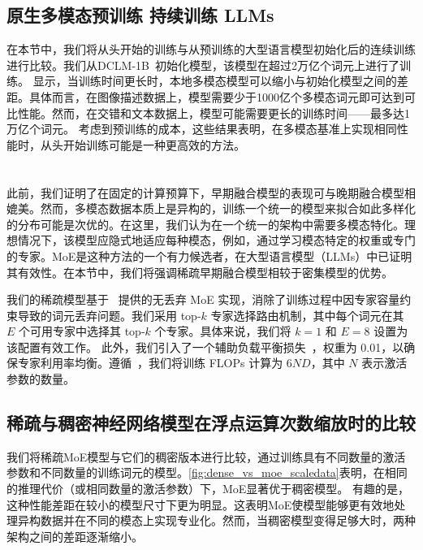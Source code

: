 \subsection{原生多模态预训练 \textbf{\vs} 持续训练 LLMs}
\label{sec:native_vs_continual}
在本节中，我们将从头开始的训练与从预训练的大型语言模型初始化后的连续训练进行比较。我们从DCLM-1B~\citep{fang2023data}初始化模型，该模型在超过2万亿个词元上进行了训练。
 显示，当训练时间更长时，本地多模态模型可以缩小与初始化模型之间的差距。具体而言，在图像描述数据上，模型需要少于1000亿个多模态词元即可达到可比性能。然而，在交错和文本数据上，模型可能需要更长的训练时间——最多达1万亿个词元。
考虑到预训练的成本，这些结果表明，在多模态基准上实现相同性能时，从头开始训练可能是一种更高效的方法。






\section{}
此前，我们证明了在固定的计算预算下，早期融合模型的表现可与晚期融合模型相媲美。然而，多模态数据本质上是异构的，训练一个统一的模型来拟合如此多样化的分布可能是次优的。在这里，我们认为在一个统一的架构中需要多模态特化。理想情况下，该模型应隐式地适应每种模态，例如，通过学习模态特定的权重或专门的专家。MoE是这种方法的一个有力候选者，在大型语言模型（LLMs）中已证明其有效性。在本节中，我们将强调稀疏早期融合模型相较于密集模型的优势。



 我们的稀疏模型基于~\citet{gale2023megablocks} 提供的无丢弃 MoE 实现，消除了训练过程中因专家容量约束导致的词元丢弃问题。我们采用 top-$k$ 专家选择路由机制，其中每个词元在其 $E$ 个可用专家中选择其 top-$k$ 个专家。具体来说，我们将 $k=1$ 和 $E=8$ 设置为该配置有效工作。  
此外，我们引入了一个辅助负载平衡损失~\citep{shazeer2017outrageously}，权重为 0.01，以确保专家利用率均衡。遵循~\citet{abnar2025parameters}，我们将训练 FLOPs 计算为 $6ND$，其中 $N$ 表示激活参数的数量。  



\subsection{稀疏与稠密神经网络模型在浮点运算次数缩放时的比较}  
我们将稀疏MoE模型与它们的稠密版本进行比较，通过训练具有不同数量的激活参数和不同数量的训练词元的模型。\cref{fig:dense_vs_moe_scaledata}表明，在相同的推理代价（或相同数量的激活参数）下，MoE显著优于稠密模型。  
有趣的是，这种性能差距在较小的模型尺寸下更为明显。这表明MoE使模型能够更有效地处理异构数据并在不同的模态上实现专业化。然而，当稠密模型变得足够大时，两种架构之间的差距逐渐缩小。



